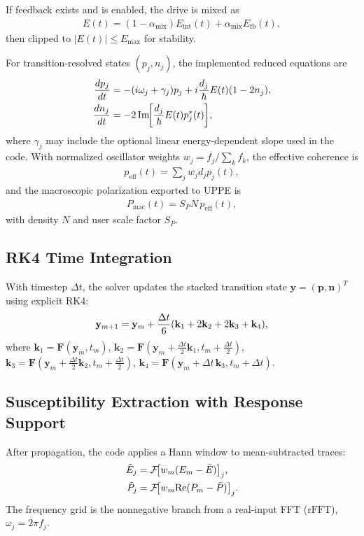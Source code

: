 \documentclass[aps,pra,twocolumn,reprint,superscriptaddress,nofootinbib]{revtex4-2}
\let\originalleft\left
\let\originalright\right
\renewcommand{\left}{\mathopen{}\mathclose\bgroup\originalleft}
\renewcommand{\right}{\aftergroup\egroup\originalright}
\begin{document}
If feedback exists and is enabled, the drive is mixed as
\begin{align}
E(t) = (1-\alpha_{\mathrm{mix}})E_{\mathrm{int}}(t)
+ \alpha_{\mathrm{mix}}E_{\mathrm{fb}}(t),
\end{align}
then clipped to $|E(t)|\le E_{\max}$ for stability.

For transition-resolved states $(p_j,n_j)$, the implemented reduced equations
are
\begin{align}
\frac{dp_j}{dt}
&= -\left(i\omega_j+\gamma_j\right)p_j
+ i\frac{d_j}{\hbar}E(t)\left(1-2n_j\right), \\
\frac{dn_j}{dt}
&= -2\,\mathrm{Im}\!\left[
\frac{d_j}{\hbar}E(t)p_j^*(t)\right],
\end{align}
where $\gamma_j$ may include the optional linear energy-dependent slope used in
the code. With normalized oscillator weights
$w_j=f_j/\sum_k f_k$, the effective coherence is
\begin{align}
p_{\mathrm{eff}}(t)=\sum_j w_j d_j p_j(t),
\end{align}
and the macroscopic polarization exported to UPPE is
\begin{align}
P_{\mathrm{mac}}(t)
= S_P N\,p_{\mathrm{eff}}(t),
\end{align}
with density $N$ and user scale factor $S_P$.

\subsection{RK4 Time Integration}
With timestep $\Delta t$, the solver updates the stacked transition state
$\mathbf{y}=(\mathbf{p},\mathbf{n})^T$ using explicit RK4:
\begin{align}
\mathbf{y}_{m+1}
= \mathbf{y}_m + \frac{\Delta t}{6}
\left(\mathbf{k}_1+2\mathbf{k}_2+2\mathbf{k}_3+\mathbf{k}_4\right),
\end{align}
where
$\mathbf{k}_1=\mathbf{F}(\mathbf{y}_m,t_m)$,
$\mathbf{k}_2=\mathbf{F}(\mathbf{y}_m+\frac{\Delta t}{2}\mathbf{k}_1,t_m+\frac{\Delta t}{2})$,
$\mathbf{k}_3=\mathbf{F}(\mathbf{y}_m+\frac{\Delta t}{2}\mathbf{k}_2,t_m+\frac{\Delta t}{2})$,
$\mathbf{k}_4=\mathbf{F}(\mathbf{y}_m+\Delta t\,\mathbf{k}_3,t_m+\Delta t)$.

\subsection{Susceptibility Extraction with Response Support}
After propagation, the code applies a Hann window to mean-subtracted traces:
\begin{align}
\tilde{E}_j &= \mathcal{F}\!\left[w_m(E_m-\bar{E})\right]_j, \\
\tilde{P}_j &= \mathcal{F}\!\left[w_m\mathrm{Re}(P_m-\bar{P})\right]_j.
\end{align}
The frequency grid is the nonnegative branch from a real-input FFT
($\mathrm{rFFT}$), $\omega_j=2\pi f_j$.
\end{document}
